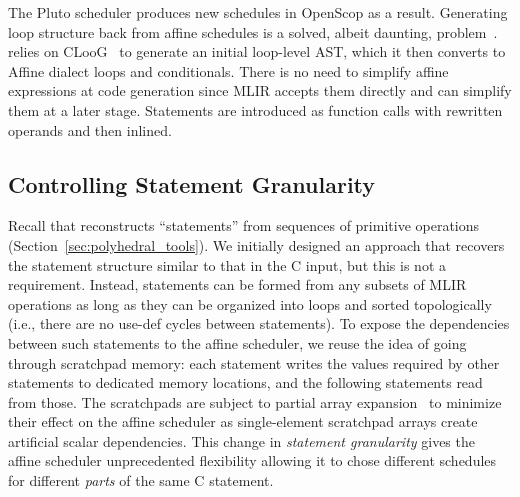 
The Pluto scheduler produces new schedules in OpenScop as a result. Generating loop structure back from affine schedules is a solved, albeit daunting, problem~\cite{cloog,grosser2015polyhedral}. \tool relies on CLooG~\cite{cloog} to generate an initial loop-level AST, which it then converts to Affine dialect loops and conditionals. There is no need to simplify affine expressions at code generation since MLIR accepts them directly and can simplify them at a later stage. Statements are introduced as function calls with rewritten operands and then inlined.

\subsection{Controlling Statement Granularity}\label{sec:stmt_splitting}

Recall that \tool reconstructs ``statements'' from sequences of primitive operations (Section~\ref{sec:polyhedral_tools}). We initially designed an approach that recovers the statement structure similar to that in the C input, but this is not a requirement. Instead, statements can be formed from any subsets of MLIR operations as long as they can be organized into loops and sorted topologically (i.e., there are no use-def cycles between statements). To expose the dependencies between such statements to the affine scheduler, we reuse the idea of going through scratchpad memory: each statement writes the values required by other statements to dedicated memory locations, and the following statements read from those. The scratchpads are subject to partial array expansion~\cite{array_expansion} to minimize their effect on the affine scheduler as single-element scratchpad arrays create artificial scalar dependencies.
This change in \emph{statement granularity} gives the affine scheduler unprecedented flexibility allowing it to chose different schedules for different \emph{parts} of the same C statement.

